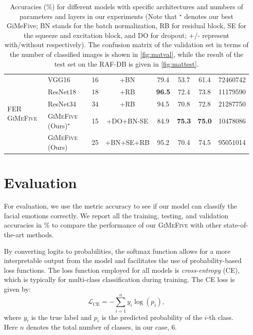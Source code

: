 \begin{table}[ht]
\begin{tabular}{@{}llcccccr@{}}
    \midrule
    \midrule
    \multirow{5}{*}{FER \textsc{GiMeFive}} & VGG16~\cite{SimonyanZ14a} & 16 & +BN & 79.4 & 53.7 & 61.4 & 72460742 \\
    & ResNet18~\cite{HeZRS16} & 18 & +RB  & \textbf{96.5} & 72.4 & 73.8 & 11179590 \\
    & ResNet34~\cite{HeZRS16} & 34 & +RB  & 94.5 & 70.8 & 72.8 & 21287750 \\
    &\textsc{GiMeFive} (Ours)\textcolor{LMUGreen}{$^\star$} & 15 & +DO+BN-SE & 84.9 & \textbf{75.3} & \textbf{75.0} & 10478086 \\
    &\textsc{GiMeFive} (Ours) & 25 & +BN+SE+RB & 95.2 & 70.4 & 74.5 & 95051014 \\
    \bottomrule
  \end{tabular}
  \caption{Accuracies (\%) for different models with specific architectures and numbers of parameters and layers in our experiments 
  (Note that \textcolor{LMUGreen}{$^\star$} denotes our best GiMeFive; 
  BN stands for the batch normalization, 
  RB for residual block, 
  SE for the squeeze and excitation block, 
  and DO for dropout; 
  +/- represent with/without respectively). 
  The confusion matrix of the validation set in terms of the number of classified images is shown in \cref{fig:matval}, 
  while the result of the test set on the RAF-DB is given in \cref{fig:mattest}.} 
  \label{tab:model}
\end{table}

\section{Evaluation}
\label{sec:evaluation}

For evaluation, we use the metric accuracy to see if our model can classify the facial emotions correctly. 
We report all the training, testing, and validation accuracies in \% 
to compare the performance of our \textsc{GiMeFive} with other state-of-the-art methods. 

By converting logits to probabilities, 
the softmax function allows for a more interpretable output from the model and facilitates the use of probability-based loss functions. 
The loss function employed for all models is \textit{cross-entropy} (CE), 
which is typically for multi-class classification during training. 
The CE loss is given by: 
\begin{equation}
  \mathcal{L}_{\text{CE}} = -\sum_{i=1}^{n} y_i \log(p_i),
\end{equation}
where $y_i$ is the true label and $p_i$ is the predicted probability of the $i$-th class. 
Here $n$ denotes the total number of classes, in our case, 6.

